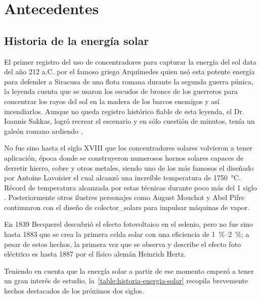 \section{Antecedentes}

	\subsection{Historia de la energía solar}
		
		El primer registro del uso de concentradores para capturar la energía del sol data del año 212 a.C. por el famoso griego Arquímedes quien usó esta potente energía para defender a Siracusa de una flota romana durante la segunda guerra púnica, la leyenda cuenta que se usaron los escudos de bronce de los guerreros para concentrar los rayos del sol en la madera de los barcos enemigos y así incendiarlos. Aunque no queda registro histórico fiable de esta leyenda, el Dr. Ioannis Sakkas, logró recrear el escenario y en sólo cuestión de minutos, tenía un galeón romano ardiendo \cite{africa_archimedes_1975}.
		
		No fue sino hasta el siglo XVIII que los concentradores solares volvieron a tener aplicación, época donde se construyeron numerosos hornos solares capaces de derretir hierro, cobre y otros metales, siendo uno de los más famosos el diseñado por Antoine Lavoisier el cual alcanzó una increíble temperatura de \SI{1750}{\degreeCelsius}. Récord de temperatura alcanzada por estas técnicas durante poco más del 1 siglo \cite{kalogirou_solar_2004}. Posteriormente otros ilustres personajes como August Mouchot y Abel Pifre continuaron con el diseño de \glspl{colector_solar} para impulsar máquinas de vapor.
		
		En 1839 Becquerel descubrió el efecto fotovoltaico en el selenio, pero no fue sino hasta 1883 que se crea la primera celda solar con una eficiencia de \qtyrange{1}{2}{\percent}; a pesar de estos hechos, la primera vez que se observa y describe el efecto foto eléctrico es hasta 1887 por el físico alemán Heinrich Hertz. 
		
		Teniendo en cuenta que la energía solar a partir de ese momento empezó a tener un gran interés de estudio, la~\cref{table:historia-energia-solar} recopila brevemente hechos destacados de los próximos dos siglos.
		

